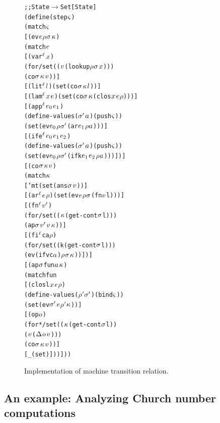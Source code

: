 \documentclass[preprint,onecolumn,9pt]{sigplanconf} %
\begin{document}
\begin{figure}
\begin{alltt}
  ;; State \(\to\) Set[State]
  (define (step \(\mstate\))
    (match \(\mstate\)
      [(ev \(\mexp\) \(\rho\) \(\msto\) \(\mkont\))
       (match \(\mexp\)
         [(var\(\superscript\mlab\) \(\mvar\))
          (for/set ((\(\mval\) (lookup \(\rho\) \(\msto\) \(\mvar\))))
            (co \(\msto\) \(\mkont\) \(\mval\)))]
         [(lit\(\superscript\mlab\) \(\mlit\)) (set (co \(\msto\) \(\mkont\) \(\mlit\)))]
         [(lam\(\superscript\mlab\) \(\mvar\) \(\mexp\)) (set (co \(\msto\) \(\mkont\) (clos \(\mvar\) \(\mexp\) \(\rho\))))]
         [(app\(\superscript\mlab\) \(\mexp\subscript0\) \(\mexp\subscript1\))
          (define-values (\(\msto'\) \(\maddr\)) (push \(\mstate\)))
          (set (ev \(\mexp\subscript0\) \(\rho\) \(\msto'\) (ar \(\mexp\subscript1\) \(\rho\) \(\maddr\))))]
         [(ife\(\superscript\mlab\) \(\mexp\subscript0\) \(\mexp\subscript1\) \(\mexp\subscript2\))
          (define-values (\(\msto'\) \(\maddr\)) (push \(\mstate\)))
          (set (ev \(\mexp\subscript0\) \(\rho\) \(\msto'\) (ifk \(\mexp\subscript1\) \(\mexp\subscript2\) \(\rho\) \(\maddr\))))])]
      [(co \(\msto\) \(\mkont\) \(\mval\))
       (match \(\mkont\)
         ['mt (set (ans \(\msto\) \(\mval\)))]
         [(ar\(\superscript\mlab\) \(\mexp\) \(\rho\)) (set (ev \(\mexp\) \(\rho\) \(\msto\) (fn \(\mval\) l)))]
         [(fn\(\superscript\mlab\) \(\mval'\))
          (for/set ((\(\mkont\) (get-cont \(\msto\) l)))
            (ap \(\msto\) \(\mval'\) \(\mval\) \(\mkont\)))]
         [(fi\(\superscript\mlab\) c a \(\rho\))
          (for/set ((k (get-cont \(\msto\) l)))
            (ev (if v c \(\maddr\)) \(\rho\) \(\msto\) \(\mkont\)))])]
      [(ap \(\msto\) fun \(\maddr\) \(\mkont\))
       (match fun
         [(clos l \(\mvar\) \(\mexp\) \(\rho\))
          (define-values (\(\rho'\) \(\msto'\)) (bind \(\mstate\)))
          (set (ev \(\msto'\) \(\mexp\) \(\rho'\) \(\mkont\)))]
         [(op \(\mop\))
          (for*/set ((\(\mkont\) (get-cont \(\msto\) l))
                     (\(\mval\) (\(\interpdelta\) \(\mop\) \(\mval\))))
            (co \(\msto\) \(\mkont\) \(\mval\)))]
         [_ (set)]))]))
\end{alltt}
\caption{Implementation of machine transition relation.}
\end{figure}

\subsection{An example: Analyzing Church number computations}
\end{document}
